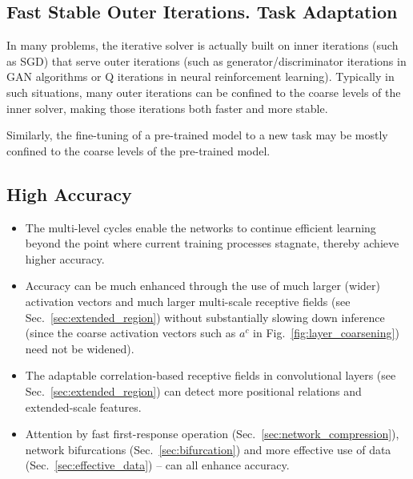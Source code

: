 \documentclass{article} %
\begin{document}
\subsection{Fast Stable Outer Iterations. Task Adaptation}
\label{sec:out_iteration}
In many problems, the iterative solver is actually built on inner iterations (such as SGD) that serve outer iterations (such as generator/discriminator iterations in GAN algorithms or Q iterations in neural reinforcement learning). Typically in such situations, many outer iterations can be confined to the coarse levels of the inner solver, making those iterations both faster and more stable.

Similarly, the fine-tuning of a pre-trained model to a new task may be mostly confined to the coarse levels of the pre-trained model.

\subsection{High Accuracy}
\label{sec:high_accuracy}
\begin{itemize}
\item The multi-level cycles enable the networks to continue efficient learning beyond the point where current training processes stagnate, thereby achieve higher accuracy.
\item Accuracy can be much enhanced through the use of much larger (wider) activation vectors and much larger multi-scale receptive fields (see Sec.~\ref{sec:extended_region}) without substantially slowing down inference (since the coarse activation vectors such as $a^c$ in Fig.~\ref{fig:layer_coarsening}) need not be widened).
\item The adaptable correlation-based receptive fields in convolutional layers (see Sec.~\ref{sec:extended_region}) can detect more positional relations and extended-scale features.
  \item Attention by fast first-response operation (Sec.~\ref{sec:network_compression}), network bifurcations (Sec.~\ref{sec:bifurcation}) and more effective use of data (Sec.~\ref{sec:effective_data}) -- can all enhance accuracy.
\end{itemize}
\end{document}
